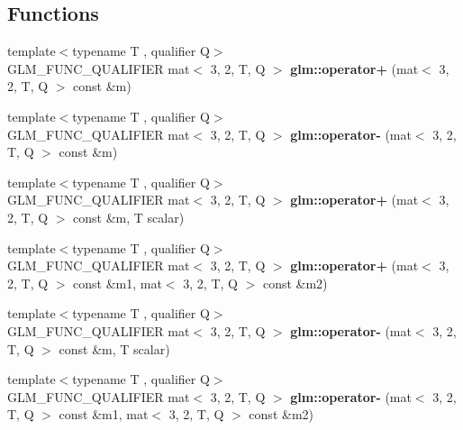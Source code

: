 \subsection*{Functions}
\begin{DoxyCompactItemize}
\item 
\mbox{\label{type__mat3x2_8inl_a00d05fc731c3d1fd422057580f26e9f3}} 
{\footnotesize template$<$typename T , qualifier Q$>$ }\\G\+L\+M\+\_\+\+F\+U\+N\+C\+\_\+\+Q\+U\+A\+L\+I\+F\+I\+ER mat$<$ 3, 2, T, Q $>$ {\bfseries glm\+::operator+} (mat$<$ 3, 2, T, Q $>$ const \&m)
\item 
\mbox{\label{type__mat3x2_8inl_a4c4badbd6ef6ab9804d99d755fb8a277}} 
{\footnotesize template$<$typename T , qualifier Q$>$ }\\G\+L\+M\+\_\+\+F\+U\+N\+C\+\_\+\+Q\+U\+A\+L\+I\+F\+I\+ER mat$<$ 3, 2, T, Q $>$ {\bfseries glm\+::operator-\/} (mat$<$ 3, 2, T, Q $>$ const \&m)
\item 
\mbox{\label{type__mat3x2_8inl_aaa32473c452e73fc4eb88f03726597c5}} 
{\footnotesize template$<$typename T , qualifier Q$>$ }\\G\+L\+M\+\_\+\+F\+U\+N\+C\+\_\+\+Q\+U\+A\+L\+I\+F\+I\+ER mat$<$ 3, 2, T, Q $>$ {\bfseries glm\+::operator+} (mat$<$ 3, 2, T, Q $>$ const \&m, T scalar)
\item 
\mbox{\label{type__mat3x2_8inl_a7298d6a215681bb8db9d534e6afa6562}} 
{\footnotesize template$<$typename T , qualifier Q$>$ }\\G\+L\+M\+\_\+\+F\+U\+N\+C\+\_\+\+Q\+U\+A\+L\+I\+F\+I\+ER mat$<$ 3, 2, T, Q $>$ {\bfseries glm\+::operator+} (mat$<$ 3, 2, T, Q $>$ const \&m1, mat$<$ 3, 2, T, Q $>$ const \&m2)
\item 
\mbox{\label{type__mat3x2_8inl_a5199599463fc528e4ee85e8202abdd24}} 
{\footnotesize template$<$typename T , qualifier Q$>$ }\\G\+L\+M\+\_\+\+F\+U\+N\+C\+\_\+\+Q\+U\+A\+L\+I\+F\+I\+ER mat$<$ 3, 2, T, Q $>$ {\bfseries glm\+::operator-\/} (mat$<$ 3, 2, T, Q $>$ const \&m, T scalar)
\item 
\mbox{\label{type__mat3x2_8inl_a34ac4f10148485d75cb6ad599ebe79f7}} 
{\footnotesize template$<$typename T , qualifier Q$>$ }\\G\+L\+M\+\_\+\+F\+U\+N\+C\+\_\+\+Q\+U\+A\+L\+I\+F\+I\+ER mat$<$ 3, 2, T, Q $>$ {\bfseries glm\+::operator-\/} (mat$<$ 3, 2, T, Q $>$ const \&m1, mat$<$ 3, 2, T, Q $>$ const \&m2)

\end{DoxyCompactItemize}

